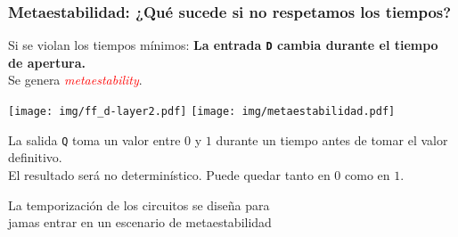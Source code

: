 \documentclass[aspectratio=169]{beamer}
\begin{document}
\begin{frame}[fragile,t]
    \frametitle{Metaestabilidad: ¿Qué sucede si no respetamos los tiempos?}
    Si se violan los tiempos mínimos: \textbf{La entrada \texttt{D} cambia durante el tiempo de apertura.}\\
    \bigskip
    \pause
    Se genera {\Large \textcolor{red}{\emph{metaestability}}.}\\
    \begin{center}
    \texttt{[image: img/ff\_d-layer2.pdf]} \hspace{2cm} \texttt{[image: img/metaestabilidad.pdf]}
    \end{center}
    La salida \texttt{Q} toma un valor entre $0$ y $1$ durante un tiempo antes de tomar el valor definitivo.\\
    \bigskip
    \pause
    El resultado será no determinístico. Puede quedar tanto en $0$ como en $1$.\\
    \begin{center}
    \textcolor{verdeuca}{La temporización de los circuitos se diseña para\\
    jamas entrar en un escenario de metaestabilidad}
    \end{center}
\end{frame}
\end{document}
